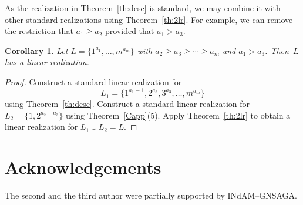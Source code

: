 \documentclass{amsart}
\newtheorem{cor}[prop]{Corollary}
\theoremstyle{definition}
\numberwithin{equation}{section}
\begin{document}
As the realization in Theorem~\ref{th:desc} is standard, we may combine it with other standard realizations using Theorem~\ref{th:2lr}.
For example, we can remove the restriction that $a_1 \geq a_2$ provided that $a_1 > a_3$.

\begin{cor}\label{cor:desc2}
Let $L = \{ 1^{a_1}, \ldots, m^{a_m} \}$ with $a_2 \geq a_3 \geq \cdots \geq a_m$ and $a_1 > a_3$.  Then~$L$ has a linear realization.
\end{cor}

\begin{proof}
Construct a standard linear realization for
$$L_1 = \{  1^{a_1 - 1},  2^{a_3}, 3^{a_3},  \ldots, m^{a_m} \}$$
using Theorem~\ref{th:desc}.  Construct a standard linear realization for $L_2 = \{ 1, 2^{a_2-a_3} \}$ using Theorem~\ref{Capp}(5).
Apply Theorem~\ref{th:2lr} to obtain a linear realization for $L_1 \cup L_2 = L$.
\end{proof}

\section*{Acknowledgements}

The second and the third author were partially supported by INdAM--GNSAGA.
\end{document}
